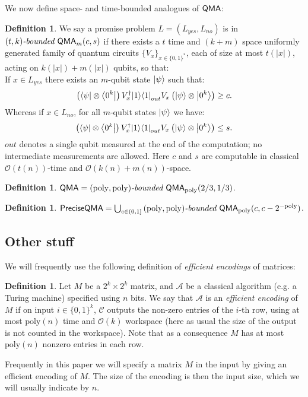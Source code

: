 \documentclass[11pt]{article}
\theoremstyle{definition}
\newtheorem{definition}[theorem]{Definition}
\theoremstyle{remark}
\newcommand\QMA{{\sf{QMA}}}
\newcommand\QMAexp{{\sf{PreciseQMA}}}
\newcommand\bddQMA[5]{{\left(#1,#2\right)}\textit{-bounded }\QMA_{#3}(#4,#5)}
\newcommand\bigoh{\mathcal{O}}
\newcommand{\poly}{\textrm{poly}}
\begin{document}
We now define space- and time-bounded analogues of $\QMA$:
\begin{definition}We say a promise problem $L=(L_{yes},L_{no})$ is in $\bddQMA{t}{k}{m}{c}{s}$ if there exists a $t$ time and $(k+m)$ space uniformly generated family of quantum circuits $\{ V_x\}_{x\in\{0,1\}^*}$, each of size at most $t(|x|)$, acting on $k(|x|)+m(|x|)$ qubits, so that:\\

If $x \in L_{yes}$ there exists an $m$-qubit state ${\left\vert{\psi}\right\rangle}$ such that:
\begin{equation}
\left({\left\langle{\psi}\right\vert}\otimes {\left\langle{0^k}\right\vert}\right) V^\dagger_x {\left\vert{1}\right\rangle}{\left\langle{1}\right\vert}_{out} V_x \left({\left\vert{\psi}\right\rangle}\otimes {\left\vert{0^k}\right\rangle}\right) \ge c.
\end{equation}
Whereas if $x \in L_{no}$, for all $m$-qubit states ${\left\vert{\psi}\right\rangle}$ we have:
\begin{equation}
\left({\left\langle{\psi}\right\vert}\otimes {\left\langle{0^k}\right\vert}\right) V^\dagger_x {\left\vert{1}\right\rangle}{\left\langle{1}\right\vert}_{out} V_x \left({\left\vert{\psi}\right\rangle}\otimes {\left\vert{0^k}\right\rangle}\right) \le s.
\end{equation}
$out$ denotes a single qubit measured at the end of the computation; no intermediate measurements are allowed.  
Here $c$ and $s$ are computable in classical $\bigoh(t(n))$-time and $\bigoh(k(n)+m(n))$-space.
  \end{definition}

\begin{definition} $\QMA=\bddQMA{\poly}{\poly}{\poly}{2/3}{1/3}$.
\end{definition}
\begin{definition} $\QMAexp=\bigcup_{c \in (0,1]}\bddQMA{\poly}{\poly}{\poly}{c}{c-2^{-\poly}}$.
\end{definition}

\subsection{Other stuff}
We will frequently use the following definition of \emph{efficient encodings} of matrices:
\begin{definition}\label{def: efficient encoding}Let $M$ be a $2^{k} \times 2^{k}$ matrix, and $\mathcal{A}$ be a classical algorithm (e.g. a Turing machine) specified using $n$ bits. We say that $\mathcal{A}$ is an \emph{efficient encoding} of $M$ if on input $i\in\{0,1\}^k$, $\mathcal{C}$ outputs the non-zero entries of the $i$-th row, using at most $\poly(n)$ time and $\bigoh(k)$ workspace (here as usual the size of the output is not counted in the workspace). Note that as a consequence $M$ has at most $\poly(n)$ nonzero entries in each row.
\end{definition}
Frequently in this paper we will specify a matrix $M$ in the input by giving an efficient encoding of $M$. The size of the encoding is then the input size, which we will usually indicate by $n$.
\end{document}
